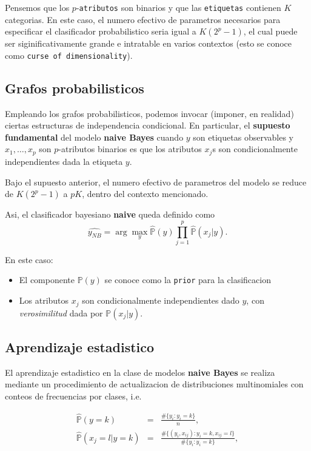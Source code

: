 \documentclass[11pt,]{article}
\begin{document}
Pensemos que los \(p\)-\texttt{atributos} son binarios y que las
\texttt{etiquetas} contienen \(K\) categorias. En este caso, el numero
efectivo de parametros necesarios para especificar el clasificador
probabilistico seria igual a \(K(2^p-1)\), el cual puede ser
siginificativamente grande e intratable en varios contextos (esto se
conoce como \texttt{curse\ of\ dimensionality}).

\subsection{Grafos probabilisticos}\label{grafos-probabilisticos-1}

Empleando los grafos probabilisticos, podemos invocar (imponer, en
realidad) ciertas estructuras de independencia condicional. En
particular, el \textbf{supuesto fundamental} del modelo \textbf{naive
Bayes} cuando \(y\) son etiquetas observables y \(x_1,\ldots,x_p\) son
\(p\)-atributos binarios es que los atributos \(x_j\)s son
condicionalmente independientes dada la etiqueta \(y\).

Bajo el supuesto anterior, el numero efectivo de parametros del modelo
se reduce de \(K(2^p-1)\) a \(pK\), dentro del contexto mencionado.

Asi, el clasificador bayesiano \textbf{naive} queda definido como \[
\widehat{y_{NB}}=\arg\max_{y}\widehat{\mathbb{P}}\left(y\right)\prod_{j=1}^{p}\widehat{\mathbb{P}}(x_j|y).\]

En este caso:

\begin{itemize}
\item
  El componente \(\mathbb{P}\left(y\right)\) se conoce como la
  \texttt{prior} para la clasificacion
\item
  Los atributos \(x_j\) son condicionalmente independientes dado \(y\),
  con \emph{verosimilitud} dada por \(\mathbb{P}(x_j|y)\).
\end{itemize}

\subsection{Aprendizaje estadistico}\label{aprendizaje-estadistico}

El aprendizaje estadistico en la clase de modelos \textbf{naive Bayes}
se realiza mediante un procedimiento de actualizacion de distribuciones
multinomiales con conteos de frecuencias por clases, i.e.

\begin{eqnarray}
  \widehat{\mathbb{P}}(y=k) & = & \frac{ \#\{y_i:y_i=k\} }{ n },
  \nonumber \\
  \widehat{\mathbb{P}}(x_j=l|y=k) & = & \frac{ \#\{(y_i,x_{ij}):y_i=k,x_{ij}=l\} }{ \#\{y_i:y_i=k\} },
\end{eqnarray}
\end{document}
